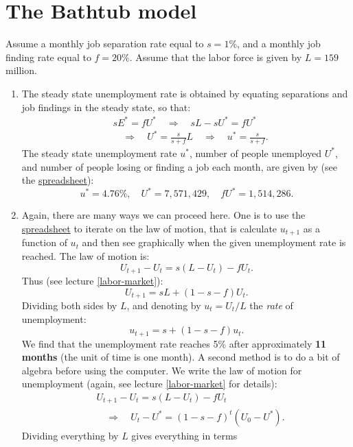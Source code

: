 \documentclass[]{book}
\theoremstyle{definition}
\theoremstyle{definition}
\theoremstyle{definition}
\theoremstyle{remark}
\begin{document}
\section{The Bathtub model}\label{the-bathtub-model-1}

Assume a monthly job separation rate equal to \(s=1\)\%, and a monthly
job finding rate equal to \(f=20\)\%. Assume that the labor force is
given by \(L=159\) million.

\begin{enumerate}
\def\labelenumi{\arabic{enumi}.}
\item
  The steady state unemployment rate is obtained by equating separations
  and job findings in the steady state, so that: \[
  \begin{aligned}
  &s E^{*} = f U^{*} \quad \Rightarrow \quad sL - s U^{*} = fU^{*}\\
  &\quad \Rightarrow \quad U^{*}=\frac{s}{s+f}L \quad \Rightarrow \quad u^{*}=\frac{s}{s+f}.
  \end{aligned}
  \] The steady state unemployment rate \(u^{*}\), number of people
  unemployed \(U^{*}\), and number of people losing or finding a job
  each month, are given by (see the
  \href{https://docs.google.com/spreadsheets/d/1h9JJD8K2_IE166gdj78waf0zu4YDY9Rp3r5oiJR_06s/edit?usp=sharing}{spreadsheet}):
  \[u^{*}=4.76\%, \quad U^{*}=7,571,429, \quad f U^{*} = 1,514,286.\]
\item
  Again, there are many ways we can proceed here. One is to use the
  \href{https://docs.google.com/spreadsheets/d/1h9JJD8K2_IE166gdj78waf0zu4YDY9Rp3r5oiJR_06s/edit?usp=sharing}{spreadsheet}
  to iterate on the law of motion, that is calculate \(u_{t+1}\) as a
  function of \(u_t\) and then see graphically when the given
  unemployment rate is reached. The law of motion is:
  \[U_{t+1}-U_t = s(L-U_t) -f U_t.\] Thus (see lecture
  \ref{labor-market}): \[U_{t+1}=sL + \left(1-s-f\right)U_t.\] Dividing
  both sides by \(L\), and denoting by \(u_{t}=U_t/L\) the \emph{rate}
  of unemployment: \[u_{t+1}=s+\left(1-s-f\right)u_t.\] We find that the
  unemployment rate reaches 5\% after approximately \textbf{11 months}
  (the unit of time is one month). A second method is to do a bit of
  algebra before using the computer. We write the law of motion for
  unemployment (again, see lecture \ref{labor-market} for details):
  \[\begin{aligned}
  &U_{t+1}-U_t = s(L-U_t) -f U_t \\
  & \quad \Rightarrow \quad U_{t}-U^{*}=(1-s-f)^t\left(U_0-U^{*}\right).
  \end{aligned}\] Dividing everything by \(L\) gives everything in terms

\end{enumerate}
\end{document}
